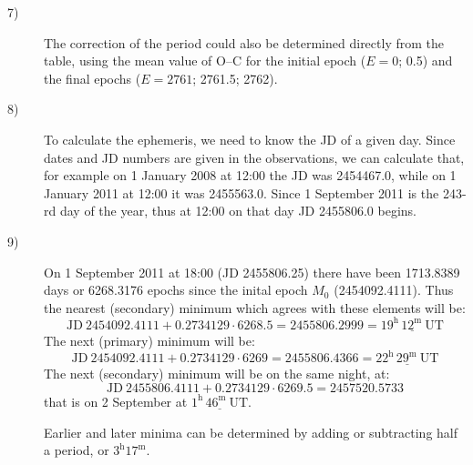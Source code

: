 \begin{description}
\item[7)] The correction of the period could also be determined directly from
  the table, using the mean value of O--C for the initial epoch ($E = 0$; 0.5)
  and the final epochs ($E = 2761$; 2761.5; 2762).

\item[8)] To calculate the ephemeris, we need to know the JD of a given day.
  Since dates and JD numbers are given in the observations, we can calculate
  that, for example on 1 January 2008 at 12:00 the JD was 2454467.0, while on
  1 January 2011 at 12:00 it was 2455563.0. Since 1 September 2011 is the
  243-rd day of the year, thus at 12:00 on that day JD 2455806.0 begins.

\item[9)] On 1 September 2011 at 18:00 (JD 2455806.25) there have been
  1713.8389 days or 6268.3176 epochs since the inital epoch $M_0$
  (2454092.4111). Thus the nearest (secondary) minimum which agrees with
  these elements will be:
  \[ \mathrm{JD}\ 2454092.4111 + 0.2734129 \cdot 6268.5 = 2455806.2999
     = \underline{19^{\mathrm{h}}\,12^{\mathrm{m}}\ \mathrm{UT}} \]
  The next (primary) minimum will be:
  \[ \mathrm{JD}\ 2454092.4111 + 0.2734129 \cdot 6269 = 2455806.4366
     = \underline{22^{\mathrm{h}}\,29^{\mathrm{m}}\ \mathrm{UT}} \]
  The next (secondary) minimum will be on the same night, at:
  \[ \mathrm{JD}\ 2455806.4111 + 0.2734129 \cdot 6269.5 = 2457520.5733 \]
  that is on 2 September at
  $\underline{1^{\mathrm{h}}\,46^{\mathrm{m}}\ \mathrm{UT}}$.

  Earlier and later minima can be determined by adding or subtracting half a
  period, or $3^{\mathrm{h}}17^{\mathrm{m}}$.
\end{description}
